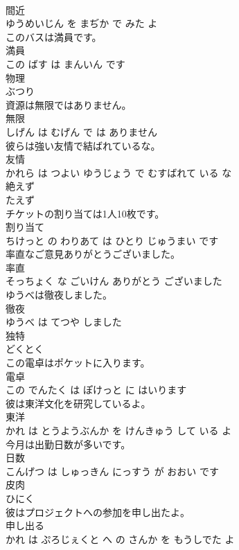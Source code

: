 \documentclass[8pt]{extreport}
\begin{document}
\begin{CJK}{UTF8}{min}
\\	間近 
\\	ゆうめいじん を まぢか で みた よ			
\\	このバスは満員です。	
\\	満員 
\\	この ばす は まんいん です			
\\	物理	
\\	ぶつり			
\\	資源は無限ではありません。	
\\	無限 
\\	しげん は むげん で は ありません			
\\	彼らは強い友情で結ばれているな。	
\\	友情 
\\	かれら は つよい ゆうじょう で むすばれて いる な			
\\	絶えず	
\\	たえず			
\\	チケットの割り当ては1人10枚です。	
\\	割り当て 
\\	ちけっと の わりあて は ひとり じゅうまい です			
\\	率直なご意見ありがとうございました。	
\\	率直 
\\	そっちょく な ごいけん ありがとう ございました			
\\	ゆうべは徹夜しました。	
\\	徹夜 
\\	ゆうべ は てつや しました			
\\	独特	
\\	どくとく			
\\	この電卓はポケットに入ります。	
\\	電卓 
\\	この でんたく は ぽけっと に はいります			
\\	彼は東洋文化を研究しているよ。	
\\	東洋 
\\	かれ は とうようぶんか を けんきゅう して いる よ			
\\	今月は出勤日数が多いです。	
\\	日数 
\\	こんげつ は しゅっきん にっすう が おおい です			
\\	皮肉	
\\	ひにく			
\\	彼はプロジェクトへの参加を申し出たよ。	
\\	申し出る 
\\	かれ は ぷろじぇくと へ の さんか を もうしでた よ			

\end{CJK}
\end{document}
